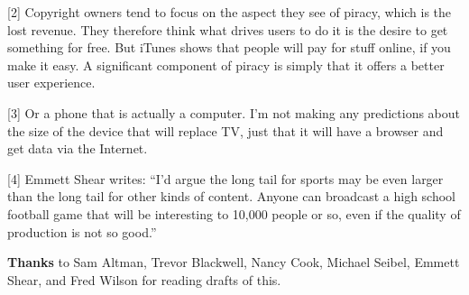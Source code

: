 {[}2{]} Copyright owners tend to focus on the aspect they see of piracy,
which is the lost revenue. They therefore think what drives users to do
it is the desire to get something for free. But iTunes shows that people
will pay for stuff online, if you make it easy. A significant component
of piracy is simply that it offers a better user experience.

{[}3{]} Or a phone that is actually a computer. I'm not making any
predictions about the size of the device that will replace TV, just that
it will have a browser and get data via the Internet.

{[}4{]} Emmett Shear writes: ``I'd argue the long tail for sports may be
even larger than the long tail for other kinds of content. Anyone can
broadcast a high school football game that will be interesting to 10,000
people or so, even if the quality of production is not so good.''

\textbf{Thanks} to Sam Altman, Trevor Blackwell, Nancy Cook, Michael
Seibel, Emmett Shear, and Fred Wilson for reading drafts of this.
